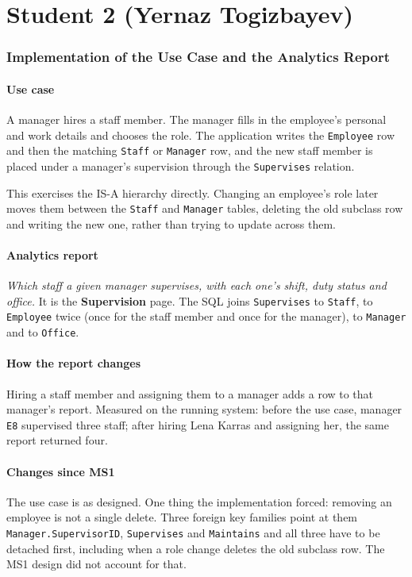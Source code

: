 \documentclass[a4paper, 11pt]{article}          %
\begin{document}
\section*{Student 2 (Yernaz Togizbayev)}
\setcounter{subsubsection}{1}
\subsubsection{Implementation of the Use Case and the Analytics Report}

\paragraph{Use case} A manager hires a staff member. The manager fills in the
employee's personal and work details and chooses the role. The application
writes the \texttt{Employee} row and then the matching \texttt{Staff} or
\texttt{Manager} row, and the new staff member is placed under a manager's
supervision through the \texttt{Supervises} relation.

This exercises the IS-A hierarchy directly. Changing an employee's role later
moves them between the \texttt{Staff} and \texttt{Manager} tables, deleting the
old subclass row and writing the new one, rather than trying to update across
them.

\paragraph{Analytics report} \emph{Which staff a given manager supervises, with
each one's shift, duty status and office.} It is the \textbf{Supervision} page.
The SQL joins \texttt{Supervises} to \texttt{Staff}, to \texttt{Employee} twice
(once for the staff member and once for the manager), to \texttt{Manager} and to
\texttt{Office}.

\paragraph{How the report changes} Hiring a staff member and assigning them to a
manager adds a row to that manager's report. Measured on the running system:
before the use case, manager \texttt{E8} supervised three staff; after hiring
Lena Karras and assigning her, the same report returned four.

\paragraph{Changes since MS1} The use case is as designed. One thing the
implementation forced: removing an employee is not a single delete. Three
foreign key families point at them \textendash{}
\texttt{Manager.SupervisorID}, \texttt{Supervises} and \texttt{Maintains}
\textendash{} and all three have to be detached first, including when a role
change deletes the old subclass row. The MS1 design did not account for that.
\end{document}
